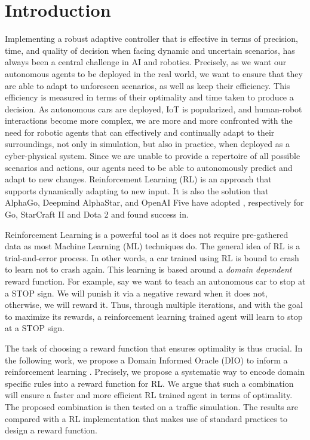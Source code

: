 \documentclass[a4paper,11pt]{article}
\begin{document}
\section{Introduction}
Implementing a robust adaptive controller that is effective in terms
of precision, time, and quality of decision
when facing dynamic and uncertain scenarios, has always been a central
challenge in AI and robotics. Precisely, as we want our autonomous agents to be deployed 
in the real world, we want to ensure that they are able to adapt to unforeseen scenarios, as well as 
keep their efficiency. This efficiency is measured in terms of their optimality and time taken to produce a decision. 
%
As autonomous cars are deployed, IoT is popularized, and human-robot interactions become more complex, we
are more and more confronted with the need for robotic agents that can effectively and continually adapt
to their surroundings, not only in simulation, but also in practice, when deployed as a cyber-physical system. 
Since we are unable to provide a repertoire of all possible scenarios and actions,
our agents need to be able to autonomously predict and adapt to new
changes. Reinforcement Learning (RL) is an approach that
supports dynamically adapting to new input. It is also the solution that AlphaGo, Deepmind AlphaStar, and OpenAI Five have
adopted \cite{li2019reinforcement}, respectively for Go, StarCraft II and Dota 2 and found success in. 

\medskip

Reinforcement Learning is a powerful tool as it does not require pre-gathered data as most Machine Learning (ML) 
techniques do. The general idea of RL is a trial-and-error process. In other words, a car trained using RL is bound to 
crash to learn not to crash again. This learning is based around a \textit{domain dependent} reward function. For example, say we want to teach an autonomous car to stop at a STOP sign. We will 
punish it via a negative reward when it does not, otherwise, we will reward it. Thus, through multiple iterations, 
and with the goal to maximize its rewards, a reinforcement learning trained agent will learn to stop at a STOP sign. 
%

\medskip

The task of choosing a reward function that ensures optimality is thus crucial. In the following work, we propose a Domain Informed Oracle (DIO) to
inform a reinforcement learning . Precisely, we propose a systematic way to encode domain specific rules into a reward function for RL. We argue that such a combination will ensure 
a faster and more efficient RL trained agent in terms of optimality. The proposed combination is then tested on a traffic simulation. The results are compared with 
a RL implementation that makes use of standard practices to design a reward function. 
\end{document}
